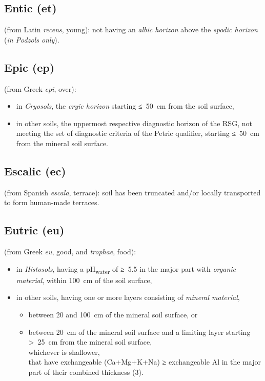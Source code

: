 \documentclass[
  letterpaper,
  DIV=11,
  numbers=noendperiod]{scrreprt}
\providecommand{\tightlist}{%
  \setlength{\itemsep}{0pt}\setlength{\parskip}{0pt}}\usepackage{longtable,booktabs,array}
\begin{document}
\hypertarget{entic-et}{%
\subsection{Entic (et)}\label{entic-et}}

(from Latin \emph{recens}, young): not having an \emph{albic horizon}
above the \emph{spodic horizon} (\emph{in Podzols only}).

\hypertarget{epic-ep}{%
\subsection{Epic (ep)}\label{epic-ep}}

(from Greek \emph{epi}, over):

\begin{itemize}
\tightlist
\item
  in \emph{Cryosols}, the \emph{cryic horizon} starting ≤~50~cm from the
  soil surface,
\item
  in other soils, the uppermost respective diagnostic horizon of the
  RSG, not meeting the set of diagnostic criteria of the Petric
  qualifier, starting ≤~50~cm from the mineral soil surface.
\end{itemize}

\hypertarget{escalic-ec}{%
\subsection{Escalic (ec)}\label{escalic-ec}}

(from Spanish \emph{escala}, terrace): soil has been truncated and/or
locally transported to form human-made terraces.

\hypertarget{eutric-eu}{%
\subsection{Eutric (eu)}\label{eutric-eu}}

(from Greek \emph{eu}, good, and \emph{trophae}, food):

\begin{itemize}
\tightlist
\item
  in \emph{Histosols}, having a pH\textsubscript{water} of ≥~5.5 in the
  major part with \emph{organic material}, within 100~cm of the soil
  surface,
\item
  in other soils, having one or more layers consisting of \emph{mineral
  material},

  \begin{itemize}
  \tightlist
  \item
    between 20 and 100~cm of the mineral soil surface, or
  \item
    between 20~cm of the mineral soil surface and a limiting layer
    starting \textgreater~25~cm from the mineral soil surface,\\
    whichever is shallower,\\
    that have exchangeable (Ca+Mg+K+Na) ≥ exchangeable Al in the major
    part of their combined thickness (3).
  \end{itemize}
\end{itemize}
\end{document}
